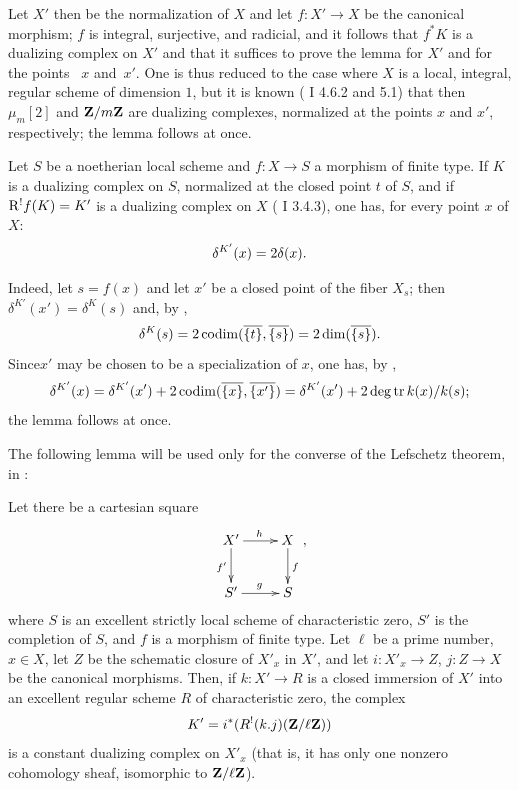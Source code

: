 Let $X'$ then be the normalization of $X$ and let $f:X'\to X$ be the canonical morphism; $f$ is integral, surjective, and radicial, and it follows that $f^*K$ is a dualizing complex on $X'$ and that it suffices to prove the lemma for $X'$ and for the points ~$x$ and~$x'$. One is thus reduced to the case where $X$ is a local, integral, regular scheme of dimension $1$, but it is known (\cf {} I 4.6.2 and 5.1) that then $\mu_m[2]$ and $\ZZ/m\ZZ$ are dualizing complexes, normalized at the points $x$ and $x'$, respectively; the lemma follows at once.

\begin{sublemme} \label{XIV.2.3.2} Let $S$ be a noetherian local scheme and $f:X\to S$ a morphism of finite type. If $K$ is a dualizing complex on $S$, normalized at the closed point $t$ of $S$, and if $\R^!f(K)=K'$ is a dualizing complex on $X$ (\cf {} I 3.4.3), one has, for every point $x$ of $X$:$$
\delta^{\sisi{K}{{K'}}}(x)=2\delta(x).
$$
\end{sublemme}

Indeed, let $s=f(x)$ and let $x'$ be a closed point of the fiber $X_s$; then $\delta^{K'}(x')=\delta^K(s)$ and, by ,
$$
\delta^K(s)=2\codim(\overline{\{t\}}, \overline{\{s\}})=2\dim(\overline{\{s\}}).
$$
Since\pageoriginaled $x'$ may be chosen to be a specialization of $x$, one has, by ,
$$
\delta^{K'}(x)=\delta^{K'}(x')+2\codim(\overline{\{x\}}, \overline{\{x'\}})=\delta^{K'}(x')+2\degtr k(x)/k(s);$$
the lemma follows at once.

The following lemma will be used only for the converse of the Lefschetz theorem, in \numero{}:

\begin{sublemme} \label{XIV.2.3.3}
Let there be a cartesian square
$$
\xymatrix{X'\ar[r]^{h}\ar[d]_{f'}&X\ar[d]^f\\S'\ar[r]^g&S},
$$
where $S$ is an excellent strictly local scheme of characteristic zero, $S'$ is the completion of $S$, and $f$ is a morphism of finite type. Let $\ell$ be a prime number, $x\in X$, let $Z$ be the schematic closure of $X'_x$ in $X'$, and let $i:X'_x\to Z$, $j:Z\to X$ be the canonical morphisms. Then, if $k:X'\to R$ is a closed immersion of $X'$ into an excellent regular scheme $R$ of characteristic zero, the complex
$$K'=i^*(R^!(k.j)(\ZZ/\ell\ZZ))$$
is a constant dualizing complex on $X'_x$ (that is, it has only one nonzero cohomology sheaf, isomorphic to $\ZZ/\ell\ZZ$).
\end{sublemme}

